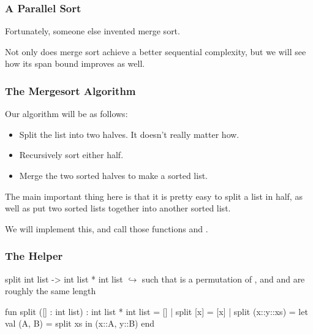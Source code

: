 \documentclass[aspectratio=169, handout]{beamer}
\begin{document}
\begin{frame}[fragile]
  \frametitle{A Parallel Sort}

  Fortunately, someone else invented merge sort\footnotemark.

  \pause
  \vspace{\fill}


  \pause
  \vspace{\fill}

  Not only does merge sort achieve a better sequential complexity, but we will
  see how its span bound improves as well.
  
\end{frame}

\begin{frame}[fragile]
  \frametitle{The Mergesort Algorithm}

  Our algorithm will be as follows:

  \pause
  \begin{itemize}
    \item Split the list into two halves. It doesn't really matter how. \pause
    \item Recursively sort either half. \pause
    \item Merge the two sorted halves to make a sorted list. 
  \end{itemize}

  \pause 
  \vspace{\fill}

  The main important thing here is that it is pretty easy to split a list in 
  half, as well as put two sorted lists together into another sorted list.

  \pause 
  \vspace{\fill}

  We will implement this, and call those functions  and .
\end{frame}

\begin{frame}[fragile]
  \frametitle{The  Helper}

  \spec
    {split}
    {int list -> int list * int list}
    {}
    { $\hookrightarrow$  such that  is a
    permutation of , and  and  are roughly the
    same length}

  \pause 
  \vspace{\fill}

  \begin{codeblock}
    fun split ([] : int list) : int list * int list = []
      | split [x] = [x]
      | split (x::y::xs) = 
          let
            val (A, B) = split xs
          in
            (x::A, y::B)
          end
  \end{codeblock}
\end{frame}
\end{document}
